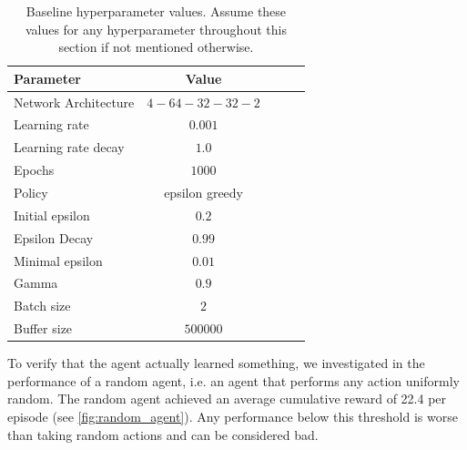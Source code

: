\documentclass{article}
\begin{document}
\begin{table}[ht]
   \caption{Baseline hyperparameter values. Assume these values for any hyperparameter throughout this section if not mentioned otherwise.}
   \label{tbl:baseline_config}
   \vskip 0.15in
   \begin{center}
   \begin{small}
   \begin{sc}
   \begin{tabular}{lcccr}
   \toprule
   Parameter & Value \\
   \midrule
   Network Architecture    & $4-64-32-32-2$ \\
   Learning rate           & $0.001$ \\
   Learning rate decay     & $1.0$   \\
   Epochs                  & $1000$ \\
   Policy                  & epsilon greedy \\
   Initial epsilon         & $0.2$ \\
   Epsilon Decay           & $0.99$ \\
   Minimal epsilon         & $0.01$ \\
   Gamma                   & $0.9$ \\
   Batch size              & $2$ \\
   Buffer size             & $500000$ \\
   \bottomrule
   \end{tabular}
   \end{sc}
   \end{small}
   \end{center}
   \vskip -0.1in
\end{table}

To verify that the agent actually learned something, 
we investigated in the performance of a random agent, 
i.e. an agent that performs any action uniformly random. 
The random agent achieved an average cumulative reward of 22.4 per episode (see \autoref{fig:random_agent}).
Any performance below this threshold is worse than taking random actions 
and can be considered bad.
\end{document}
